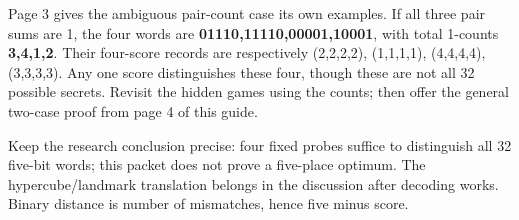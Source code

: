 \documentclass[11pt]{article}
\begin{document}
Page 3 gives the ambiguous pair-count case its own examples. If all three pair sums are 1, the four words are \textbf{01110,11110,00001,10001}, with total 1-counts \textbf{3,4,1,2}. Their four-score records are respectively (2,2,2,2), (1,1,1,1), (4,4,4,4), (3,3,3,3). Any one score distinguishes these four, though these are not all 32 possible secrets. Revisit the hidden games using the counts; then offer the general two-case proof from page 4 of this guide.

Keep the research conclusion precise: four fixed probes suffice to distinguish all 32 five-bit words; this packet does not prove a five-place optimum. The hypercube/landmark translation belongs in the discussion after decoding works. Binary distance is number of mismatches, hence five minus score.
\end{document}
